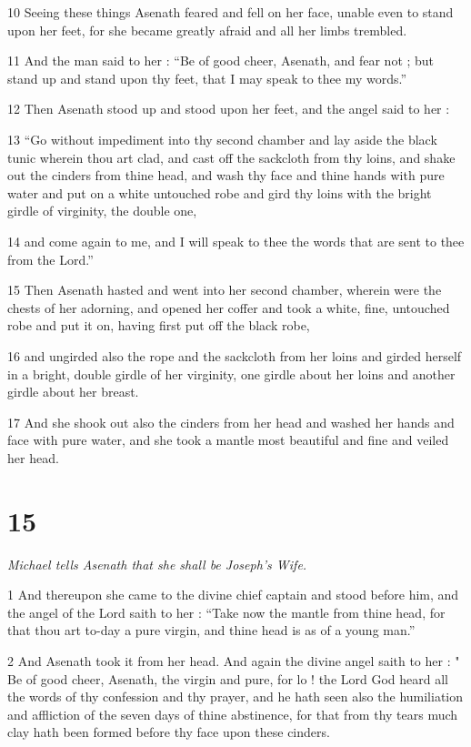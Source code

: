 10 Seeing these things Asenath feared and fell on her face, unable even to stand upon her feet, for she became greatly afraid and all her limbs trembled. 

11 And the man said to her : “Be of good cheer, Asenath, and fear not ; but stand up and stand upon thy feet, that I may speak to thee my words.” 

12 Then Asenath stood up and stood upon her feet, and the angel said to her : 

13 “Go without impediment into thy second chamber and lay aside the black tunic wherein thou art clad, and cast off the sackcloth from thy loins, and shake out the cinders from thine head, and wash thy face and thine hands with pure water and put on a white untouched robe and gird thy loins with the bright girdle of virginity, the double one, 

14 and come again to me, and I will speak to thee the words that are sent to thee from the Lord.” 

15 Then Asenath hasted and went into her second chamber, wherein were the chests of her adorning, and opened her coffer and took a white, fine, untouched robe and put it on, having first put off the black robe, 

16 and ungirded also the rope and the sackcloth from her loins and girded herself in a bright, double girdle of her virginity, one girdle about her loins and another girdle about her breast. 

17 And she shook out also the cinders from her head and washed her hands and face with pure water, and she took a mantle most beautiful and fine and veiled her head. 

\chapter{15}

\par \textit{Michael tells Asenath that she shall be Joseph's Wife.}

1 And thereupon she came to the divine chief captain and stood before him, and the angel of the Lord saith to her : “Take now the mantle from thine head, for that thou art to-day a pure virgin, and thine head is as of a young man.” 

2 And Asenath took it from her head. And again the divine angel saith to her : " Be of good cheer, Asenath, the virgin and pure, for lo ! the Lord God heard all the words of thy confession and thy prayer, and he hath seen also the humiliation and affliction of the seven days of thine abstinence, for that from thy tears much clay hath been formed before thy face upon these cinders. 

